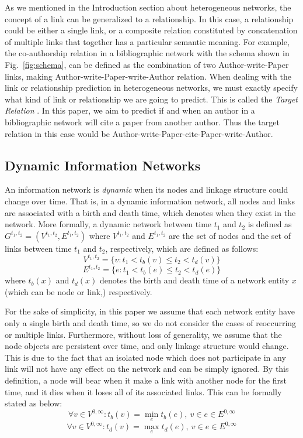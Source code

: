 As we mentioned in the Introduction section about heterogeneous networks, the concept of a link can be generalized to a relationship. In this case, a relationship could be either a single link, or a composite relation constituted by concatenation of multiple links that together has a particular semantic meaning. For example, the co-authorship relation in a bibliographic network with the schema shown in Fig.~\ref{fig:schema}, can be defined as the combination of two Author-write-Paper links, making Author-write-Paper-write-Author relation. When dealing with the link or relationship prediction in heterogeneous networks, we must exactly specify what kind of link or relationship we are going to predict. This is called the \emph{Target Relation} \cite{sun2012will}. In this paper, we aim to predict if and when an author in a bibliographic network will cite a paper from another author. Thus the target relation in this case would be Author-write-Paper-cite-Paper-write-Author.

\subsection{Dynamic Information Networks}
An information network is \emph{dynamic} when its nodes and linkage structure could change over time. That is, in a dynamic information network, all nodes and links are associated with a birth and death time, which denotes when they exist in the network. More formally, a dynamic network between time $t_1$ and $t_2$ is defined as $G^{t_1,t_2}=(V^{t_1,t_2}, E^{t_1,t_2})$ where $V^{t_1,t_2}$ and $E^{t_1,t_2}$ are the set of nodes and the set of links between time $t_1$ and $t_2$, respectively, which are defined as follows:
\[V^{t_1,t_2}=\{v: t_1< t_b(v)\le t_2<t_d(v)\}\]
\[E^{t_1,t_2}=\{e: t_1< t_b(e)\le t_2<t_d(e)\}\]
where $t_b(x)$ and $t_d(x)$ denotes the birth and death time of a network entity $x$ (which can be node or link,) respectively.

For the sake of simplicity, in this paper we assume that each network entity have only a single birth and death time, so we do not consider the cases of reoccurring or multiple links. Furthermore, without loss of generality, we assume that the node objects are persistent over time, and only linkage structure would change. This is due to the fact that an isolated node which does not participate in any link will not have any effect on the network and can be simply ignored. By this definition, a node will bear when it make a link with another node for the first time, and it dies when it loses all of its associated links. This can be formally stated as below:
\[\forall v\in V^{0,\infty}: t_b(v)=\min_e t_b(e), \ v\in e\in E^{0,\infty}\]
\[\forall v\in V^{0,\infty}: t_d(v)=\max_e t_d(e), \ v\in e\in E^{0,\infty}\]

